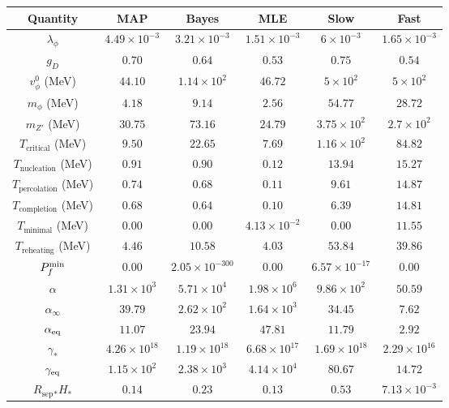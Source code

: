 \begin{tabular}{|c|c|c|c|c|c|}
\hline
Quantity & MAP & Bayes & MLE & Slow & Fast \\
\hline
$\lambda_\phi$ & $4.49 \times 10^{-3}$ & $3.21 \times 10^{-3}$ & $1.51 \times 10^{-3}$ & $6 \times 10^{-3}$ & $1.65 \times 10^{-3}$ \\
\hline
$g_D$ & $0.70$ & $0.64$ & $0.53$ & $0.75$ & $0.54$ \\
\hline
$v_\phi^0$ (MeV) & $44.10$ & $1.14 \times 10^{2}$ & $46.72$ & $5 \times 10^{2}$ & $5 \times 10^{2}$ \\
\hline
$m_{\phi}$ (MeV) & $4.18$ & $9.14$ & $2.56$ & $54.77$ & $28.72$ \\
\hline
$m_{Z'}$ (MeV) & $30.75$ & $73.16$ & $24.79$ & $3.75 \times 10^{2}$ & $2.7 \times 10^{2}$ \\
\hline
$T_\textrm{critical}$ (MeV) & $9.50$ & $22.65$ & $7.69$ & $1.16 \times 10^{2}$ & $84.82$ \\
\hline
$T_\textrm{nucleation}$ (MeV) & $0.91$ & $0.90$ & $0.12$ & $13.94$ & $15.27$ \\
\hline
$T_\textrm{percolation}$ (MeV) & $0.74$ & $0.68$ & $0.11$ & $9.61$ & $14.87$ \\
\hline
$T_\textrm{completion}$ (MeV) & $0.68$ & $0.64$ & $0.10$ & $6.39$ & $14.81$ \\
\hline
$T_\textrm{minimal}$ (MeV) & $0.00$ & $0.00$ & $4.13 \times 10^{-2}$ & $0.00$ & $11.55$ \\
\hline
$T_\textrm{reheating}$ (MeV) & $4.46$ & $10.58$ & $4.03$ & $53.84$ & $39.86$ \\
\hline
$P_f^{\rm min}$ & $0.00$ & $2.05 \times 10^{-300}$ & $0.00$ & $6.57 \times 10^{-17}$ & $0.00$ \\
\hline
$\alpha$ & $1.31 \times 10^{3}$ & $5.71 \times 10^{4}$ & $1.98 \times 10^{6}$ & $9.86 \times 10^{2}$ & $50.59$ \\
\hline
$\alpha_\infty$ & $39.79$ & $2.62 \times 10^{2}$ & $1.64 \times 10^{3}$ & $34.45$ & $7.62$ \\
\hline
$\alpha_{\rm eq}$ & $11.07$ & $23.94$ & $47.81$ & $11.79$ & $2.92$ \\
\hline
$\gamma_*$ & $4.26 \times 10^{18}$ & $1.19 \times 10^{18}$ & $6.68 \times 10^{17}$ & $1.69 \times 10^{18}$ & $2.29 \times 10^{16}$ \\
\hline
$\gamma_{\rm eq}$ & $1.15 \times 10^{2}$ & $2.38 \times 10^{3}$ & $4.14 \times 10^{4}$ & $80.67$ & $14.72$ \\
\hline
$R_\textrm{sep}{}_* H_*$ & $0.14$ & $0.23$ & $0.13$ & $0.53$ & $7.13 \times 10^{-3}$ \\
\hline
\end{tabular}